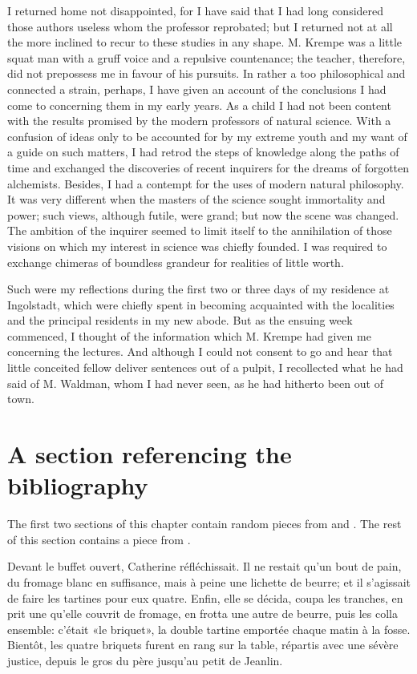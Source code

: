 I returned home not disappointed, for I have said that I had long
considered those authors useless whom the professor reprobated; but I
returned not at all the more inclined to recur to these studies in any
shape.  M. Krempe was a little squat man with a gruff voice and a
repulsive countenance; the teacher, therefore, did not prepossess me in
favour of his pursuits.  In rather a too philosophical and connected a
strain, perhaps, I have given an account of the conclusions I had come
to concerning them in my early years.  As a child I had not been
content with the results promised by the modern professors of natural
science.  With a confusion of ideas only to be accounted for by my
extreme youth and my want of a guide on such matters, I had retrod the
steps of knowledge along the paths of time and exchanged the
discoveries of recent inquirers for the dreams of forgotten alchemists.
Besides, I had a contempt for the uses of modern natural philosophy.
It was very different when the masters of the science sought
immortality and power; such views, although futile, were grand; but now
the scene was changed.  The ambition of the inquirer seemed to limit
itself to the annihilation of those visions on which my interest in
science was chiefly founded.  I was required to exchange chimeras of
boundless grandeur for realities of little worth.

Such were my reflections during the first two or three days of my
residence at Ingolstadt, which were chiefly spent in becoming
acquainted with the localities and the principal residents in my new
abode.  But as the ensuing week commenced, I thought of the information
which M. Krempe had given me concerning the lectures.  And although I
could not consent to go and hear that little conceited fellow deliver
sentences out of a pulpit, I recollected what he had said of M.
Waldman, whom I had never seen, as he had hitherto been out of town.

\section{A section referencing the bibliography}\label{sec:third_example}

The first two sections of this chapter contain random pieces from \citet{Shelley:1993:F} and \citet{Joyce:2003:U}. The rest of this section contains a piece from \citet{Zola:2004:G}.

Devant le buffet ouvert, Catherine réfléchissait.  Il ne restait qu'un
bout de pain, du fromage blanc en suffisance, mais à peine une
lichette de beurre; et il s'agissait de faire les tartines pour eux
quatre.  Enfin, elle se décida, coupa les tranches, en prit une
qu'elle couvrit de fromage, en frotta une autre de beurre, puis les
colla ensemble: c'était «le briquet», la double tartine emportée
chaque matin à la fosse.  Bientôt, les quatre briquets furent en rang
sur la table, répartis avec une sévère justice, depuis le gros du père
jusqu'au petit de Jeanlin.

